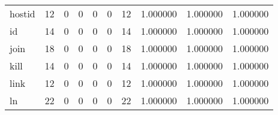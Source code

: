 \begin{tabular}{lrrrrrrrrr}
hostid    &                                      12 &                                                  0 &                                                  0 &                                                  0 &                                                  0 &                                                 12 &                                           1.000000 &                               1.000000 &                             1.000000 \\
id        &                                      14 &                                                  0 &                                                  0 &                                                  0 &                                                  0 &                                                 14 &                                           1.000000 &                               1.000000 &                             1.000000 \\
join      &                                      18 &                                                  0 &                                                  0 &                                                  0 &                                                  0 &                                                 18 &                                           1.000000 &                               1.000000 &                             1.000000 \\
kill      &                                      14 &                                                  0 &                                                  0 &                                                  0 &                                                  0 &                                                 14 &                                           1.000000 &                               1.000000 &                             1.000000 \\
link      &                                      12 &                                                  0 &                                                  0 &                                                  0 &                                                  0 &                                                 12 &                                           1.000000 &                               1.000000 &                             1.000000 \\
ln        &                                      22 &                                                  0 &                                                  0 &                                                  0 &                                                  0 &                                                 22 &                                           1.000000 &                               1.000000 &                             1.000000 \\

\end{tabular}

